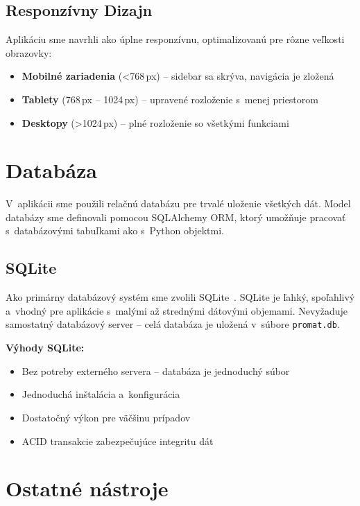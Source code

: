 \subsection{Responzívny Dizajn}

        Aplikáciu sme navrhli ako úplne responzívnu, optimalizovanú pre rôzne veľkosti obrazovky:

\begin{itemize}
  \item \textbf{Mobilné zariadenia} ({\textless}768\,px) -- sidebar sa skrýva, navigácia je zložená
  \item \textbf{Tablety} (768\,px -- 1024\,px) -- upravené rozloženie s~menej priestorom
  \item \textbf{Desktopy} ({\textgreater}1024\,px) -- plné rozloženie so všetkými funkciami
\end{itemize}

\section{Databáza}

        V~aplikácii sme použili relačnú databázu pre trvalé uloženie všetkých dát. Model databázy
sme definovali pomocou SQLAlchemy ORM, ktorý umožňuje pracovať s~databázovými
tabuľkami ako s~Python objektmi.

\subsection{SQLite}

        Ako primárny databázový systém sme zvolili SQLite~\cite{sqlite_org}. SQLite je ľahký, spoľahlivý
a~vhodný pre aplikácie s~malými až strednými dátovými objemami. Nevyžaduje samostatný
databázový server -- celá databáza je uložená v~súbore \texttt{promat.db}.

        \textbf{Výhody SQLite:}

\begin{itemize}
  \item Bez potreby externého servera -- databáza je jednoduchý súbor
  \item Jednoduchá inštalácia a~konfigurácia
  \item Dostatočný výkon pre väčšinu prípadov
  \item ACID transakcie zabezpečujúce integritu dát
\end{itemize}

\section{Ostatné nástroje}

